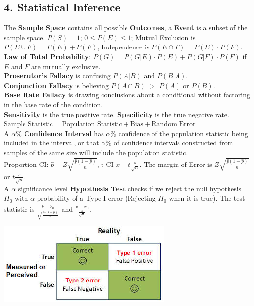 \begin{multicols*}{3}
\subsection{4. Statistical Inference}
The \textbf{Sample Space} contains all possible \textbf{Outcomes}, a \textbf{Event} is a subset of the sample space.
$P(S) = 1$; $0\leq P(E)\leq1$; Mutual Exclusion is $P(E \cup F)=P(E)+P(F)$; Independence is $P(E\cap F)=P(E)\cdot P(F)$.\\
\textbf{Law of Total Probability}: $P(G)=P(G|E)\cdot P(E)+P(G|F)\cdot P(F)$ if $E$ and $F$ are mutually exclusive.\\
\textbf{Prosecutor's Fallacy} is confusing $P(A|B)$ and $P(B|A)$.\\
\textbf{Conjunction Fallacy} is believing $P(A\cap B)$ $>$ $P(A)$ or $P(B)$.\\
\textbf{Base Rate Fallacy} is drawing conclusions about a conditional without factoring in the base rate of the condition.\\
\textbf{Sensitivity} is the true positive rate. \textbf{Specificity} is the true negative rate.\\
$\text{Sample Statistic}=\text{Population Statistic}+\text{Bias}+\text{Random Error}$\\
A \textbf{$\alpha\%$ Confidence Interval} has $\alpha\%$ confidence of the population statistic being included in the interval, or that $\alpha\%$ of confidence intervals constructed from samples of the same size will include the population statistic.\\ 
Proportion CI: $\hat{p}\pm Z\sqrt{\frac{\hat{p}(1-\hat{p})}{n}}$, t CI $\bar{x}\pm t\frac{s}{\sqrt{n}}$. The margin of Error is $Z\sqrt{\frac{\hat{p}(1-\hat{p})}{n}}$ or $t\frac{s}{\sqrt{n}}$.\\
A $\alpha$ significance level \textbf{Hypothesis Test} checks if we reject the null hypothesis $H_0$ with $\alpha$ probability of a Type I error (Rejecting $H_0$ when it is true). The test statistic is $\frac{\hat{p}-p_0}{\sqrt{\frac{\hat{p}(1-\hat{p})}{n}}}$ and $\frac{\bar{x}-x_0}{\frac{s}{\sqrt{n}}}$.
\begin{center}
    \centering
    \includegraphics[width=0.5\linewidth]{cheatsheet/type1-2_errors.png}
\end{center}
\end{multicols*}